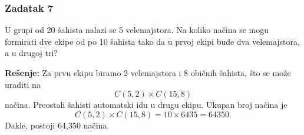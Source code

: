 \documentclass{article}
\begin{document}
\subsubsection*{Zadatak 7}
U grupi od 20 šahista nalazi se 5 velemajstora. Na koliko načina se mogu formirati dve ekipe od po 10 šahista tako da u prvoj ekipi bude dva velemajstora, a u drugoj tri?

\noindent \textbf{Rešenje:}
Za prvu ekipu biramo 2 velemajstora i 8 običnih šahista, što se može uraditi na 
\[
C(5, 2) \times C(15, 8)
\]
načina. Preostali šahisti automatski idu u drugu ekipu. Ukupan broj načina je
\[
C(5, 2) \times C(15, 8) = 10 \times 6435 = 64350.
\]
Dakle, postoji 64,350 načina.
\end{document}
